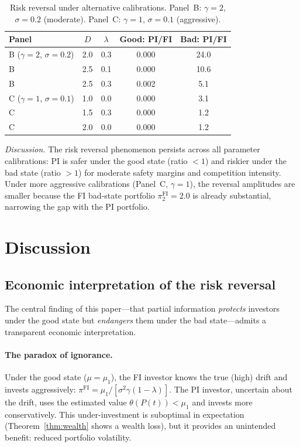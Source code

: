 \documentclass[12pt]{article}
\theoremstyle{remark}
\theoremstyle{definition}
\newcommand{\FI}{\mathrm{FI}}
\begin{document}
\begin{table}[H]
\centering
\caption{Risk reversal under alternative calibrations.
  Panel~B: $\gamma = 2$, $\sigma = 0.2$ (moderate).
  Panel~C: $\gamma = 1$, $\sigma = 0.1$ (aggressive).}
\label{tab:robust}
\smallskip
\begin{tabular}{lcccc}
\toprule
Panel & $D$ & $\lambda$ & Good: PI/FI & Bad: PI/FI \\
\midrule
B ($\gamma{=}2$, $\sigma{=}0.2$)
  & 2.0 & 0.3 & 0.000 & 24.0 \\
B & 2.5 & 0.1 & 0.000 & 10.6 \\
B & 2.5 & 0.3 & 0.002 & 5.1 \\
\midrule
C ($\gamma{=}1$, $\sigma{=}0.1$)
  & 1.0 & 0.0 & 0.000 & 3.1 \\
C & 1.5 & 0.3 & 0.000 & 1.2 \\
C & 2.0 & 0.0 & 0.000 & 1.2 \\
\bottomrule
\end{tabular}
\end{table}

\emph{Discussion.}
The risk reversal phenomenon persists across all parameter
calibrations: PI is safer under the good state (ratio $< 1$) and
riskier under the bad state (ratio $> 1$) for moderate safety margins
and competition intensity.
Under more aggressive calibrations (Panel~C, $\gamma = 1$), the
reversal amplitudes are smaller because the FI bad-state portfolio
$\pi_2^{\FI} = 2.0$ is already substantial, narrowing the gap with
the PI portfolio.


\section{Discussion}\label{sec:discuss_v2}

\subsection{Economic interpretation of the risk reversal}
\label{sec:discuss_reversal}

The central finding of this paper---that partial information
\emph{protects} investors under the good state but \emph{endangers}
them under the bad state---admits a transparent economic interpretation.

\paragraph{The paradox of ignorance.}
Under the good state ($\mu = \mu_1$), the FI investor knows the true
(high) drift and invests aggressively:
$\pi^{\FI} = \mu_1/[\sigma^2\gamma(1-\lambda)]$.
The PI investor, uncertain about the drift, uses the estimated
value $\theta(P(t)) < \mu_1$ and invests more conservatively.
This under-investment is suboptimal in expectation
(Theorem~\ref{thm:wealth} shows a wealth loss), but it provides
an unintended benefit: reduced portfolio volatility.
\end{document}
